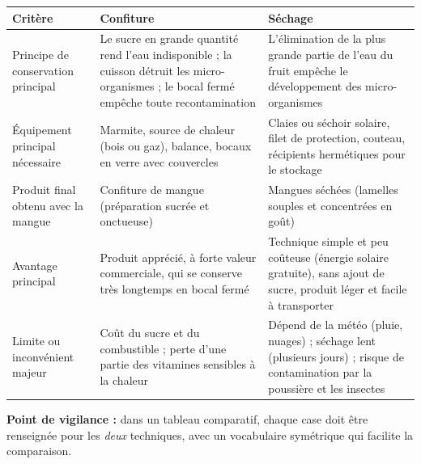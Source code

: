 \documentclass[11pt]{article}
\begin{document}
\begin{corrige}
\begin{center}
\begin{tabularx}{\linewidth}{|l|X|X|}
\hline
\rowcolor{popblueL} \textbf{Critère} & \textbf{Confiture} & \textbf{Séchage} \\
\hline
Principe de conservation principal & Le sucre en grande quantité rend l'eau indisponible ; la cuisson détruit les micro-organismes ; le bocal fermé empêche toute recontamination & L'élimination de la plus grande partie de l'eau du fruit empêche le développement des micro-organismes \\
\hline
Équipement principal nécessaire & Marmite, source de chaleur (bois ou gaz), balance, bocaux en verre avec couvercles & Claies ou séchoir solaire, filet de protection, couteau, récipients hermétiques pour le stockage \\
\hline
Produit final obtenu avec la mangue & Confiture de mangue (préparation sucrée et onctueuse) & Mangues séchées (lamelles souples et concentrées en goût) \\
\hline
Avantage principal & Produit apprécié, à forte valeur commerciale, qui se conserve très longtemps en bocal fermé & Technique simple et peu coûteuse (énergie solaire gratuite), sans ajout de sucre, produit léger et facile à transporter \\
\hline
Limite ou inconvénient majeur & Coût du sucre et du combustible ; perte d'une partie des vitamines sensibles à la chaleur & Dépend de la météo (pluie, nuages) ; séchage lent (plusieurs jours) ; risque de contamination par la poussière et les insectes \\
\hline
\end{tabularx}
\end{center}
\textbf{Point de vigilance :} dans un tableau comparatif, chaque case doit être renseignée pour les \emph{deux} techniques, avec un vocabulaire symétrique qui facilite la comparaison.
\end{corrige}
\end{document}

